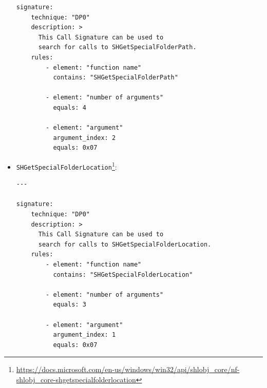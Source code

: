 \begin{itemize}
\begin{lstlisting}[caption={A Call Signature that matches a call to \texttt{SHGetSpecialFolderPath}.}, captionpos=b]
signature:
    technique: "DP0"
    description: >
      This Call Signature can be used to
      search for calls to SHGetSpecialFolderPath.
    rules:
        - element: "function name"
          contains: "SHGetSpecialFolderPath"

        - element: "number of arguments"
          equals: 4

        - element: "argument"
          argument_index: 2
          equals: 0x07
\end{lstlisting}

    \item \texttt{SHGetSpecialFolderLocation}\footnote{\tiny \url{https://docs.microsoft.com/en-us/windows/win32/api/shlobj_core/nf-shlobj_core-shgetspecialfolderlocation}}:
\begin{lstlisting}[caption={A Call Signature that matches a call to \texttt{SHGetSpecialFolderLocation}.}, captionpos=b]
---

signature:
    technique: "DP0"
    description: >
      This Call Signature can be used to
      search for calls to SHGetSpecialFolderLocation.
    rules:
        - element: "function name"
          contains: "SHGetSpecialFolderLocation"

        - element: "number of arguments"
          equals: 3

        - element: "argument"
          argument_index: 1
          equals: 0x07
\end{lstlisting}
\end{itemize}
